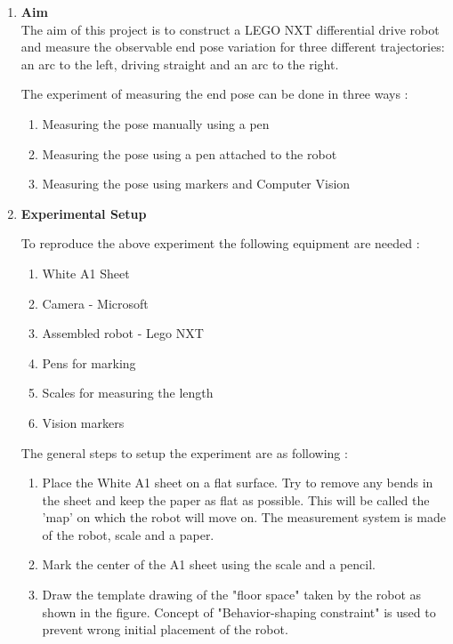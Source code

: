 \documentclass[10pt,a4paper]{article}
\begin{document}
\Large
\begin{enumerate}[label=\Roman*]

\item
\vspace{0.5cm}
\Large{\textbf{Aim}}\\

The aim of this project is to construct a LEGO NXT differential drive robot and measure the observable end pose variation for three different trajectories: an arc to the left, driving straight and an arc to the right.
\vspace{0.5cm}

The experiment of measuring the end pose can be done in three ways :
\begin{enumerate}
    \item
    Measuring the pose manually using a pen
    \item
    Measuring the pose using a pen attached to the robot
    \item
    Measuring the pose using markers and Computer Vision 
\end{enumerate}    

\vspace{0.5cm}
\item
\Large{\textbf{Experimental Setup}}\\
\vspace{0.5cm}

To reproduce the above experiment the following equipment are needed :
\begin{enumerate}
    \item
    White A1 Sheet
    \item
    Camera - Microsoft 
    \item
    Assembled robot - Lego NXT 
    \item
    Pens for marking
    \item
    Scales for measuring the length 
    \item
    Vision markers
\end{enumerate}
\vspace{0.5cm}

The general steps to setup the experiment are as following :
\begin{enumerate}
    \item
    Place the White A1 sheet on a flat surface.  Try to remove any bends in the sheet and keep the paper as flat as possible. This will be called the 'map' on which the robot will move on. The measurement system is made of the robot, scale and a paper. 
    \item
    Mark the center of the A1 sheet using the scale and a pencil.
    \item
    Draw the template drawing of the "floor space" taken by the robot as shown in the figure. Concept of "Behavior-shaping constraint" is used to prevent wrong initial placement of the robot.
    

\end{enumerate}
\end{enumerate}
\end{document}
